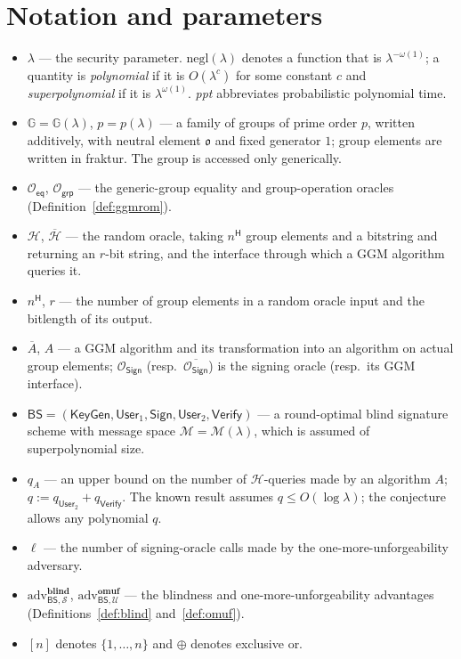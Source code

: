 \documentclass{aicr-conjecture}
\newcommand{\GG}{\mathbb{G}}
\newcommand{\MM}{\mathcal{M}}
\newcommand{\HH}{\mathcal{H}}
\newcommand{\negl}{\mathrm{negl}}
\newcommand{\BS}{\mathsf{BS}}
\newcommand{\KeyGen}{\mathsf{KeyGen}}
\newcommand{\Userone}{\mathsf{User}_1}
\newcommand{\Usertwo}{\mathsf{User}_2}
\newcommand{\Sig}{\mathsf{Sign}}
\newcommand{\Ver}{\mathsf{Verify}}
\newcommand{\Oeq}{\mathcal{O}_{\mathsf{eq}}}
\newcommand{\Ogrp}{\mathcal{O}_{\mathsf{grp}}}
\newcommand{\OSign}{\mathcal{O}_{\mathsf{Sign}}}
\newcommand{\adv}{\mathrm{adv}}
\begin{document}
\section{Notation and parameters}\label{sec:notation}

\begin{itemize}
\item $\lambda$ --- the security parameter. $\negl(\lambda)$ denotes a
  function that is $\lambda^{-\omega(1)}$; a quantity is
  \emph{polynomial} if it is $O(\lambda^{c})$ for some constant $c$ and
  \emph{superpolynomial} if it is $\lambda^{\omega(1)}$. \emph{ppt}
  abbreviates probabilistic polynomial time.
\item $\GG=\GG(\lambda)$, $p=p(\lambda)$ --- a family of groups of prime
  order $p$, written additively, with neutral element $\mathfrak{o}$ and
  fixed generator $\mathfrak{1}$; group elements are written in fraktur.
  The group is accessed only generically.
\item $\Oeq$, $\Ogrp$ --- the generic-group equality and group-operation
  oracles (Definition~\ref{def:ggmrom}).
\item $\HH$, $\overline{\HH}$ --- the random oracle, taking
  $n^{\mathsf{H}}$ group elements and a bitstring and returning an
  $r$-bit string, and the interface through which a GGM algorithm
  queries it.
\item $n^{\mathsf{H}}$, $r$ --- the number of group elements in a random
  oracle input and the bitlength of its output.
\item $\overline{A}$, $A$ --- a GGM algorithm and its transformation
  into an algorithm on actual group elements; $\OSign$ (resp.\
  $\overline{\OSign}$) is the signing oracle (resp.\ its GGM interface).
\item $\BS=(\KeyGen,\Userone,\Sig,\Usertwo,\Ver)$ --- a round-optimal
  blind signature scheme with message space $\MM=\MM(\lambda)$, which is
  assumed of superpolynomial size.
\item $q_{A}$ --- an upper bound on the number of $\HH$-queries made by
  an algorithm $A$; $q:=q_{\Usertwo}+q_{\Ver}$. The known result assumes
  $q\le O(\log\lambda)$; the conjecture allows any polynomial $q$.
\item $\ell$ --- the number of signing-oracle calls made by the
  one-more-unforgeability adversary.
\item $\adv^{\mathbf{blind}}_{\BS,\mathcal{S}}$,
  $\adv^{\mathbf{omuf}}_{\BS,\mathcal{U}}$ --- the blindness and
  one-more-unforgeability advantages
  (Definitions~\ref{def:blind} and~\ref{def:omuf}).
\item $[n]$ denotes $\{1,\dots,n\}$ and $\oplus$ denotes exclusive or.
\end{itemize}
\end{document}
